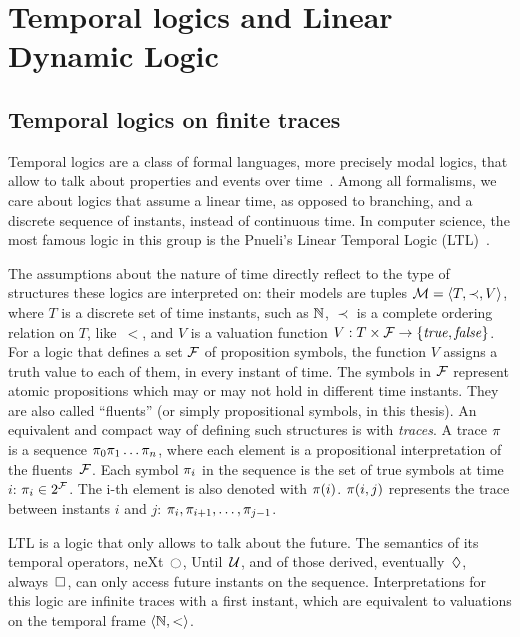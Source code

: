 \chapter{Temporal logics and Linear Dynamic Logic}

\label{ch:logics}

\section{Temporal logics on finite traces}

Temporal logics are a class of formal languages, more precisely modal logics,
that allow to talk about properties and events over
time~\cite{bib:temporal-logics-stanford}. Among all formalisms, we care about
logics that assume a linear time, as opposed to branching, and a discrete
sequence of instants, instead of continuous time.  In computer science, the
most famous logic in this group is the Pnueli's Linear Temporal Logic
(LTL)~\cite{bib:pnueli-ltl}.

The assumptions about the nature of time directly reflect to the type of
structures these logics are interpreted on: their models are tuples $\mathcal{M}
= \langle T, \prec, V \rangle$, where $T$ is a discrete set of time instants,
such as $\mathbb{N}$, $\prec$ is a complete ordering relation on $T$, like~$<$, and
$V$ is a valuation function $V: T \times \mathcal{F} \to \{\text{\textit{true}}, \text{\textit{false}}\}$. For
a logic that defines a set $\mathcal{F}$ of proposition symbols, the function $V$
assigns a truth value to each of them, in every instant of time. The symbols
in $\mathcal{F}$ represent atomic propositions which may or may not hold in
different time instants. They are also called ``fluents'' (or simply
propositional symbols, in this thesis). An equivalent and compact way of
defining such structures is with \emph{traces}. A trace $\pi$ is a sequence
$\pi_0 \pi_1 \dots \pi_n$, where each element is a propositional
interpretation of the fluents~$\mathcal{F}$. Each symbol $\pi_i$ in the
sequence is the set of true symbols at time~$i$: $\pi_i \in 2^{\mathcal{F}}$.
The i-th element is also denoted with $\pi(i)$. $\pi(i, j)$ represents
the trace between instants $i$ and $j$: $\pi_i, \pi_{i+1}, \dots,
\pi_{j-1}$.

LTL is a logic that only allows to talk about the future. The semantics of its
temporal operators, neXt~$\lnext$, Until~$\mathcal{U}$, and of those derived,
eventually~$\lozenge$, always~$\square$, can only access future instants on
the sequence. Interpretations for this logic are infinite traces with a first
instant, which are equivalent to valuations on the temporal frame $\langle \mathbb{N},
< \rangle$.

